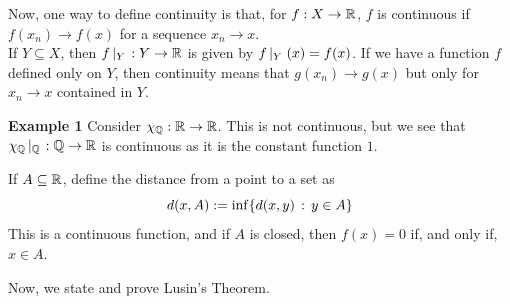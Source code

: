 Now, one way to define continuity is that, for $f : X \to \mathbb{R}$, $f$ is continuous if $f(x_n) \to f(x)$ for a sequence $x_n \to x$.\\

If $Y \subseteq X$, then $f \left|_{Y}\right. : Y \to \mathbb{R}$ is given by $f\left|_{Y}\right.(x) = f(x)$. If we have a function $f$ defined only on $Y$, then continuity means that $g(x_n) \to g(x)$ but only for $x_n \to x$ contained in $Y$. 

\begin{example}{\textbf{Example 1}}
    Consider $\chi_{\mathbb{Q}} : \mathbb{R} \to \mathbb{R}$. This is not continuous, but we see that $\chi_{\mathbb{Q}} \left|_{\mathbb{Q}}\right. : \mathbb{Q} \to \mathbb{R}$ is continuous as it is the constant function $1$. 
\end{example}

\begin{lemma}
    If $A \subseteq \mathbb{R}$, define the distance from a point to a set as
    \[ d(x, A) := \inf\{d(x, y) \, :\, y \in A\} \]
    This is a continuous function, and if $A$ is closed, then $f(x) = 0$ if, and only if, $x \in A$. 
\end{lemma}

Now, we state and prove Lusin's Theorem.

